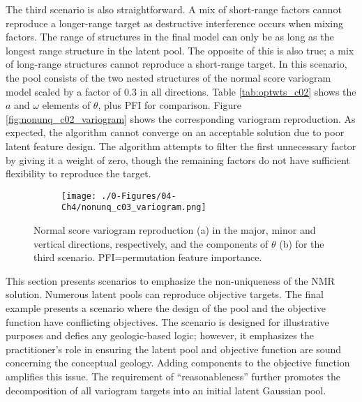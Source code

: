 The third scenario is also straightforward. A mix of short-range factors cannot reproduce a longer-range target as destructive interference occurs when mixing factors. The range of structures in the final model can only be as long as the longest range structure in the latent pool. The opposite of this is also true; a mix of long-range structures cannot reproduce a short-range target. In this scenario, the pool consists of the two nested structures of the normal score variogram model scaled by a factor of 0.3 in all directions. Table \ref{tab:optwts_c02} shows the $a$ and $\omega$ elements of $\theta$, plus \gls{PFI} for comparison. Figure \ref{fig:nonunq_c02_variogram} shows the corresponding variogram reproduction. As expected, the algorithm cannot converge on an acceptable solution due to poor latent feature design. The algorithm attempts to filter the first unnecessary factor by giving it a weight of zero, though the remaining factors do not have sufficient flexibility to reproduce the target.

\begin{figure}
    \begin{subfigure}{1.\textwidth}
        \centering
        \texttt{[image: ./0-Figures/04-Ch4/nonunq\_c03\_variogram.png]}
        \caption{}
        \label{fig:nonunq_c03_variogram}
    \end{subfigure}
    \begin{subtable}{1.\textwidth}
        \centering
        \resizebox{1\width}{!}{}
        \caption{}
        \label{tab:optwts_c03}
    \end{subtable}
    \caption{Normal score variogram reproduction (a) in the major, minor and vertical directions, respectively, and the components of $\theta$ (b) for the third scenario. PFI=permutation feature importance. }
    \label{}
\end{figure}

This section presents scenarios to emphasize the non-uniqueness of the \gls{NMR} solution. Numerous latent pools can reproduce objective targets. The final example presents a scenario where the design of the pool and the objective function have conflicting objectives. The scenario is designed for illustrative purposes and defies any geologic-based logic; however, it emphasizes the practitioner's role in ensuring the latent pool and objective function are sound concerning the conceptual geology. Adding components to the objective function amplifies this issue. The requirement of ``reasonableness'' further promotes the decomposition of all variogram targets into an initial latent Gaussian pool.

